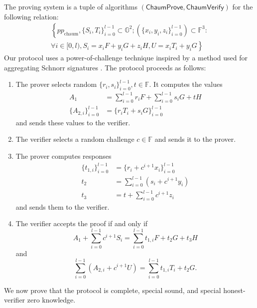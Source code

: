 \documentclass{llncs}
\newcommand{\G}{\mathbb{G}}
\newcommand{\F}{\mathbb{F}}
\newcommand{\func}[1]{\mathsf{#1}}
\begin{document}
The proving system is a tuple of algorithms $(\func{ChaumProve},\func{ChaumVerify})$ for the following relation:
\begin{multline*}
\left\{ pp_{\text{chaum}}, \{S_i, T_i\}_{i=0}^{l-1} \subset \G^2 ; (\{x_i, y_i, z_i\}_{i=0}^{l-1}) \subset \F^3 : \right. \\
\left. \forall i \in [0,l), S_i = x_i F + y_i G + z_i H, U = x_i T_i + y_i G \right\}
\end{multline*}
Our protocol uses a power-of-challenge technique inspired by a method used for aggregating Schnorr signatures \cite{batchschnorr}.
The protocol proceeds as follows:
\begin{enumerate}
    \item The prover selects random $\{r_i,s_i\}_{i=0}^{l-1}, t \in \F$.
    It computes the values
    \begin{align*}
        A_1 &= \sum_{i=0}^{l-1} r_i F + \sum_{i=0}^{l-1} s_i G + tH \\
        \{A_{2,i}\}_{i=0}^{l-1} &= \{r_i T_i + s_i G\}_{i=0}^{l-1}
    \end{align*}
    and sends these values to the verifier.
    \item The verifier selects a random challenge $c \in \F$ and sends it to the prover.
    \item The prover computes responses
    \begin{align*}
        \{t_{1,i}\}_{i=0}^{l-1} &= \{r_i + c^{i+1} x_i\}_{i=0}^{l-1} \\
        t_2 &= \sum_{i=0}^{l-1} (s_i + c^{i+1} y_i) \\
        t_3 &= t + \sum_{i=0}^{l-1} c^{i+1} z_i
    \end{align*}
    and sends them to the verifier.
    \item The verifier accepts the proof if and only if $$A_1 + \sum_{i=0}^{l-1} c^{i+1} S_i = \sum_{i=0}^{l-1} t_{1,i} F + t_2 G + t_3 H$$ and $$\sum_{i=0}^{l-1} (A_{2,i} + c^{i+1} U) = \sum_{i=0}^{l-1} t_{1,i} T_i + t_2 G.$$
\end{enumerate}

We now prove that the protocol is complete, special sound, and special honest-verifier zero knowledge.
\end{document}

